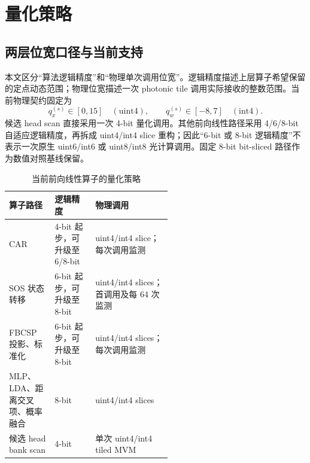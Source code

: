 \documentclass[
    TwoSide=false,
    Degree=graduate,
    GradLevel=master,
    Type=thesis,
    Title={光电混合运动想象脑机接口技术文档}
]{zjuthesis}
\begin{document}
\section{量化策略}
\subsection{两层位宽口径与当前支持}
本文区分“算法逻辑精度”和“物理单次调用位宽”。逻辑精度描述上层算子希望保留的定点动态范围；物理位宽描述一次 photonic tile 调用实际接收的整数范围。当前物理契约固定为
\begin{equation}
q_x^{(s)}\in[0,15]\quad(\mathrm{uint4}),
\qquad q_w^{(s)}\in[-8,7]\quad(\mathrm{int4}).
\end{equation}
候选 head scan 直接采用一次 4-bit 量化调用。其他前向线性路径采用 4/6/8-bit 自适应逻辑精度，再拆成 uint4/int4 slice 重构；因此“6-bit 或 8-bit 逻辑精度”不表示一次原生 uint6/int6 或 uint8/int8 光计算调用。固定 8-bit bit-sliced 路径作为数值对照基线保留。

\begin{table}[H]\centering\small
\caption{当前前向线性算子的量化策略}\label{tab:quant-policy}
\begin{tabularx}{0.96\linewidth}{|L{0.29\linewidth}|L{0.25\linewidth}|X|}\hline
算子路径 & 逻辑精度 & 物理调用 \\ \hline
CAR & 4-bit 起步，可升级至 6/8-bit & uint4/int4 slice；每次调用监测 \\ \hline
SOS 状态转移 & 6-bit 起步，可升级至 8-bit & uint4/int4 slices；首调用及每 64 次监测 \\ \hline
FBCSP 投影、标准化 & 6-bit 起步，可升级至 8-bit & uint4/int4 slices；每次调用监测 \\ \hline
MLP、LDA、距离交叉项、概率融合 & 8-bit & uint4/int4 slices \\ \hline
候选 head bank scan & 4-bit & 单次 uint4/int4 tiled MVM \\ \hline
\end{tabularx}
\end{table}
\end{document}
